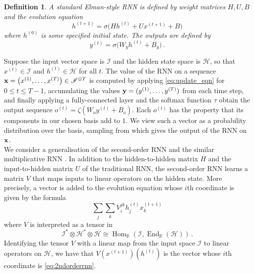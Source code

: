 \documentclass[english,letter paper,12pt,leqno]{article}
\theoremstyle{example}
\newtheorem{definition}[theorem]{Definition}
\numberwithin{equation}{section}
\def\Hom{\operatorname{Hom}}
\def\be{\begin{equation}}
\def\ee{\end{equation}}
\DeclareMathOperator{\End}{End}
\begin{document}
\begin{definition} A standard Elman-style RNN \cite{elman} is defined by weight matrices $H, U, B$ and the evolution equation
\be\label{eq:update_eqn}
h^{(t+1)} = \sigma\big( H h^{(t)} + U x^{(t+1)} + B\big)
\ee
where $h^{(0)}$ is some specified initial state. The outputs are defined by
\be\label{eq:output_rnn}
y^{(t)} = \sigma\big( W_y h^{(t)} + B_y \big)\,.
\ee
\end{definition}
Suppose the input vector space is $\mathscr{I}$ and the hidden state space is $\mathscr{H}$, so that $x^{(t)} \in \mathscr{I}$ and $h^{(t)} \in \mathscr{H}$ for all $t$. The value of the RNN on a sequence $\bold{x} = \big( x^{(1)}, \ldots, x^{(T)} \big) \in \mathscr{I}^{\oplus T}$ is computed by applying \eqref{eq:update_eqn} for $0 \le t \le T - 1$, accumulating the values $\bold{y} = (y^{(1)}, \ldots, y^{(T)})$ from each time step, and finally applying a fully-connected layer and the softmax function $\tau$ obtain the output sequence $o^{(t)} = \zeta( W_o y^{(t)} + B_o )$. Each $o^{(t)}$ has the property that its components in our chosen basis add to $1$. We view such a vector as a probability distribution over the basis, sampling from which gives the output of the RNN on $\bold{x}$.
\\

We consider a generalisation of the second-order RNN \cite{highorderrec,pollack,firstvsecond,secondorder} and the similar multiplicative RNN \cite{sutskever}. In addition to the hidden-to-hidden matrix $H$ and the input-to-hidden matrix $U$ of the traditional RNN, the second-order RNN learns a matrix $V$ that maps inputs to linear operators on the hidden state. More precisely, a vector is added to the evolution equation whose $i$th coordinate is given by the formula
\be\label{eq:2ndorderrnn}
\sum_j \sum_k V^{jk}_{i} h^{(t)}_j x^{(t+1)}_k
\ee
where $V$ is interpreted as a tensor in
\be\label{eq:input_to_operator}
\mathscr{I}^* \otimes \mathscr{H}^* \otimes \mathscr{H} \cong \Hom_{\mathbb{R}}(\mathscr{I} , \End_{\mathbb{R}}(\mathscr{H}))\,.
\ee
Identifying the tensor $V$ with a linear map from the input space $\mathscr{I}$ to linear operators on $\mathscr{H}$, we have that $V(x^{(t+1)})(h^{(t)})$ is the vector whose $i$th coordinate is \eqref{eq:2ndorderrnn}. 
\end{document}
